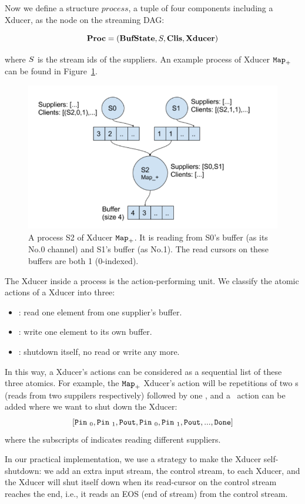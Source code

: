 Now we define a structure $process$, a tuple of four components including a Xducer, as the node on the streaming DAG:

$$ \proc  =  (\bufst, \S, \clis, \xducer) $$

where $\S$ is the stream ids of the suppliers. An example process of Xducer $\map{+}$ can be found in Figure~\ref{fig:process}.

\begin{figure}
	\centering
	\includegraphics[width=0.9\linewidth]{fig/process}
	\caption{A process S2 of Xducer $\map{+}$. 
		It is reading from S0's buffer (as its No.0 channel) and S1's buffer (as No.1). The read cursors on these buffers are both 1 (0-indexed).}
	\label{fig:process}
\end{figure}

The Xducer inside a process is the action-performing unit. 
We classify the atomic actions of a Xducer into three:
\begin{itemize}
	\item \pin: read one element from one supplier's buffer.
	\item \pout : write one element to its own buffer.
	\item \done: shutdown itself, no read or write any more.
\end{itemize}

In this way, a Xducer's actions can be considered as a sequential list of these three atomics.
For example,  the $\map{+}$ Xducer's action will be repetitions of two \pin s (reads from two suppilers respectively) followed by one \pout, and 
a \done \ action can be added where we want to shut down the Xducer: 
$$[\pin_0, \pin_1, \pout, \pin_0, \pin_1, \pout,... ,\done]$$
 where the subscripts of \pin indicates reading different suppliers.

In our practical implementation, we use a strategy to make the Xducer self-shutdown: we add an extra input stream, the control stream, to each Xducer,
and the Xducer will shut itself down when its read-cursor on the control stream reaches the end, i.e., it reads an EOS (end of stream) from the control stream.


